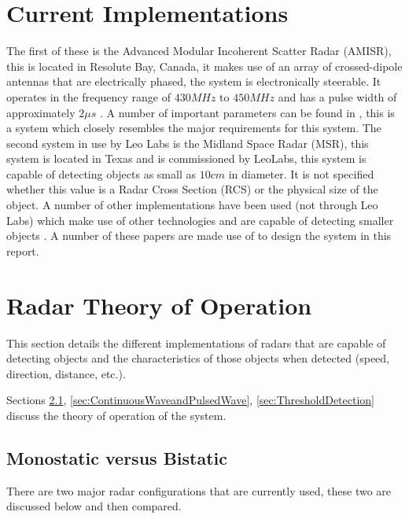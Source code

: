 \documentclass[11pt]{witseiepaper}
\begin{document}
\begin{bibunit}[witseie]
\section{Current Implementations} \label{sec:CurrentImplementations}
 The first of these is the Advanced Modular Incoherent Scatter Radar (AMISR), this is located in Resolute Bay, Canada, it makes use of an array of crossed-dipole antennas that are electrically phased, the system is electronically steerable. It operates in the frequency range of $430 MHz$ to $450 MHz$ and has a pulse width of approximately $2 \mu s$ \cite{AMISR}. A number of important parameters can be found in \cite{AMISR}, this is a system which closely resembles the major requirements for this system.
The second system in use by Leo Labs is the Midland Space Radar (MSR), this system is located in Texas and is commissioned by LeoLabs, this system is capable of detecting objects as small as $10 cm$ in diameter. It is not specified whether this value is a Radar Cross Section  (RCS) or the physical size of the object.
A number of other implementations have been used (not through Leo Labs) which make use of other technologies and are capable of detecting smaller objects \cite{EISCAT, SIMO, telescope, BeamForming, OrbitDetermination, PlanarArray}. A number of these papers are made use of to design the system in this report.


\section{Radar Theory of Operation} \label{sec:RadarTheoryOfOperation}
This section details the different implementations of radars that are capable of detecting objects and the characteristics of those objects when detected (speed, direction, distance, etc.).

Sections \ref{sec:MonostaticvsBistatic}, \ref{sec:ContinuousWaveandPulsedWave}, \ref{sec:ThresholdDetection} discuss the theory of operation of the system.

\subsection{Monostatic versus Bistatic} \label{sec:MonostaticvsBistatic}
There are two major radar configurations that are currently used, these two are discussed below and then compared.


\end{bibunit}
\end{document}
